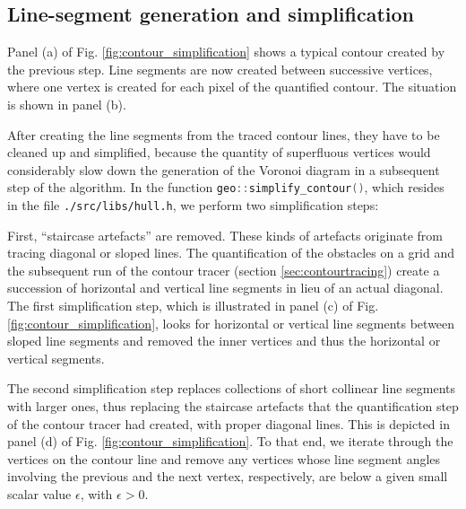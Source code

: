 \subsection{Line-segment generation and simplification}
\label{sec:line_seg_generation}
Panel (a) of Fig. \ref{fig:contour_simplification} shows a typical contour created by the previous step.
Line segments are now created between successive vertices, where one vertex is created for each pixel of the
quantified contour. The situation is shown in panel (b).

After creating the line segments from the traced contour lines, they have to be cleaned up and simplified,
because the quantity of superfluous vertices would considerably slow down the generation of the Voronoi 
diagram in a subsequent step of the algorithm.
In the function \lstinline[language=C++]|geo::simplify_contour()|, which resides in the file \lstinline|./src/libs/hull.h|,
we perform two simplification steps:

First, ``staircase artefacts'' are removed. These kinds of artefacts originate from tracing diagonal or sloped lines.
The quantification of the obstacles on a grid and the subsequent run of the contour tracer (section \ref{sec:contourtracing})
create a succession of horizontal and vertical line segments in lieu of an actual diagonal.
The first simplification step, which is illustrated in panel (c) of Fig. \ref{fig:contour_simplification}, looks
for horizontal or vertical line segments between sloped line segments and removed the inner vertices and thus the
horizontal or vertical segments.

The second simplification step replaces collections of short collinear line segments with larger ones,
thus replacing the staircase artefacts that the quantification step of the contour tracer had created,
with proper diagonal lines. This is depicted in panel (d) of Fig. \ref{fig:contour_simplification}.
To that end, we iterate through the vertices on the contour line and remove any vertices whose line segment angles
involving the previous and the next vertex, respectively, are below a given small scalar value $\epsilon$, with $\epsilon > 0$.


